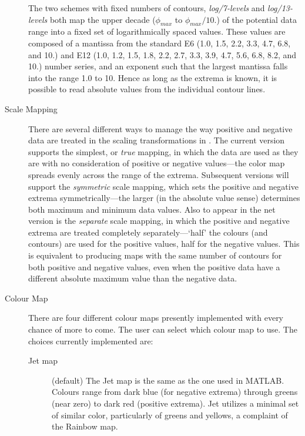 \begin{description}
    The two schemes with fixed numbers of contours, {\em log/7-levels\/}
    and {\em log/13-levels\/} both map the upper decade ($\phi_{max}$ to
    $\phi_{max}/10.$) of the potential data range into a fixed set of
    logarithmically spaced values.  These values are composed of a mantissa
    from the standard E6 (1.0, 1.5, 2.2, 3.3, 4.7, 6.8, and 10.) and E12
    (1.0, 1.2, 1.5, 1.8, 2.2, 2.7, 3.3, 3.9, 4.7, 5.6, 6.8, 8.2, and 10.)
    number series, and an exponent such that the largest mantissa falls
    into the range 1.0 to 10. Hence as long as the extrema is known, it is
    possible to read absolute values from the individual contour lines.
    
  \item[Scale Mapping] There are several different ways to manage the way
    positive and negative data are treated in the scaling transformations
    in \map{}.  The current version supports the simplest, or {\em true\/}
    mapping, in which the data are used as they are with no consideration
    of positive or negative values---the color map spreads evenly across
    the range of the extrema.  Subsequent versions will support the {\em
      symmetric\/} scale mapping, which sets the positive and negative
    extrema symmetrically---the larger (in the absolute value sense)
    determines both maximum and minimum data values.  Also to appear in the
    net version is the {\em separate\/} scale mapping, in which the
    positive and negative extrema are treated completely
    separately---`half' the colours (and contours) are used for the
    positive values, half for the negative values.  This is equivalent to
    producing maps with the same number of contours for both positive and
    negative values, even when the positive data have a different absolute
    maximum value than the negative data.
    
  \item[Colour Map] There are four different colour maps presently
    implemented with every chance of more to come. The user can select
    which colour map to use. The choices currently implemented are:
    \begin{description}
        
      \item [Jet map] (default) The Jet map is the same as the one 
        used in MATLAB. Colours range from dark
        blue (for negative extrema) through greens (near zero)
        to dark red (positive extrema).  Jet utilizes a minimal set of similar
        color, particularly of greens and yellows, a complaint of the 
        Rainbow map.


\end{description}
\end{description}
